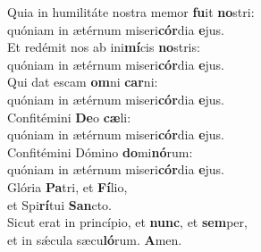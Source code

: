 \evenverse Quia in humilitáte nostra memor \textbf{fu}it \textbf{no}stri:~\*\\
\evenverse quóniam in ætérnum miseri\textbf{cór}dia \textbf{e}jus.\\
\oddverse Et redémit nos ab ini\textbf{mí}cis \textbf{no}stris:~\*\\
\oddverse quóniam in ætérnum miseri\textbf{cór}dia \textbf{e}jus.\\
\evenverse Qui dat escam \textbf{om}ni \textbf{car}ni:~\*\\
\evenverse quóniam in ætérnum miseri\textbf{cór}dia \textbf{e}jus.\\
\oddverse Confitémini \textbf{De}o \textbf{cæ}li:~\*\\
\oddverse quóniam in ætérnum miseri\textbf{cór}dia \textbf{e}jus.\\
\evenverse Confitémini Dómino \textbf{do}mi\textbf{nó}rum:~\*\\
\evenverse quóniam in ætérnum miseri\textbf{cór}dia \textbf{e}jus.\\
\oddverse Glória \textbf{Pa}tri, et \textbf{Fí}lio,~\*\\
\oddverse et Spi\textbf{rí}tui \textbf{San}cto.\\
\evenverse Sicut erat in princípio, et \textbf{nunc}, et \textbf{sem}per,~\*\\
\evenverse et in sǽcula sæcu\textbf{ló}rum. \textbf{A}men.\\
